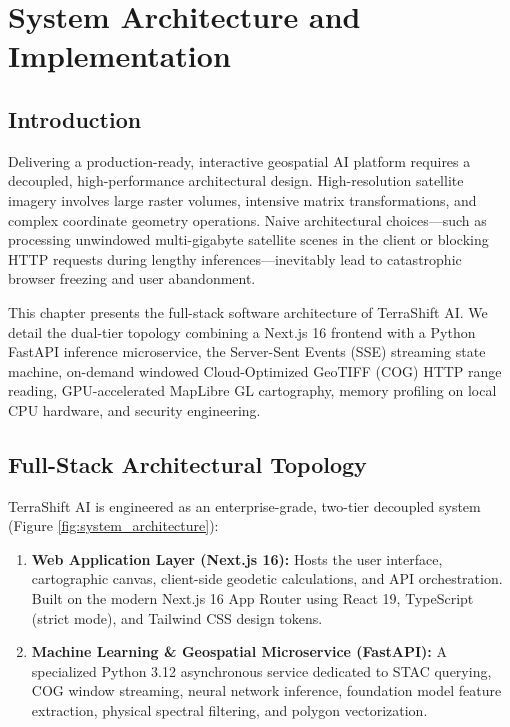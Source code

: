\chapter{System Architecture and Implementation}
\label{ch:architecture}

\section{Introduction}
\label{sec:arch_intro}
Delivering a production-ready, interactive geospatial AI platform requires a decoupled, high-performance architectural design. High-resolution satellite imagery involves large raster volumes, intensive matrix transformations, and complex coordinate geometry operations. Naive architectural choices—such as processing unwindowed multi-gigabyte satellite scenes in the client or blocking HTTP requests during lengthy inferences—inevitably lead to catastrophic browser freezing and user abandonment.

This chapter presents the full-stack software architecture of TerraShift AI. We detail the dual-tier topology combining a Next.js 16 frontend with a Python FastAPI inference microservice, the Server-Sent Events (SSE) streaming state machine, on-demand windowed Cloud-Optimized GeoTIFF (COG) HTTP range reading, GPU-accelerated MapLibre GL cartography, memory profiling on local CPU hardware, and security engineering.

\section{Full-Stack Architectural Topology}
\label{sec:arch_topology}
TerraShift AI is engineered as an enterprise-grade, two-tier decoupled system (Figure \ref{fig:system_architecture}):
\begin{enumerate}
    \item \textbf{Web Application Layer (Next.js 16):} Hosts the user interface, cartographic canvas, client-side geodetic calculations, and API orchestration. Built on the modern Next.js 16 App Router using React 19, TypeScript (strict mode), and Tailwind CSS design tokens.
    \item \textbf{Machine Learning \& Geospatial Microservice (FastAPI):} A specialized Python 3.12 asynchronous service dedicated to STAC querying, COG window streaming, neural network inference, foundation model feature extraction, physical spectral filtering, and polygon vectorization.
\end{enumerate}

